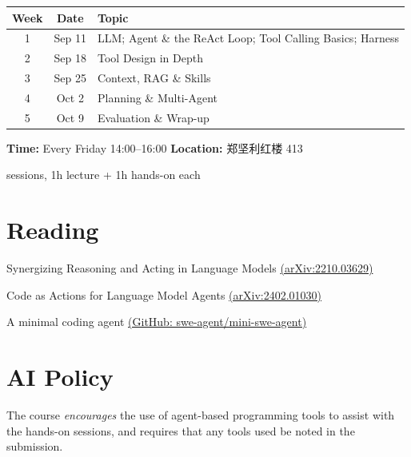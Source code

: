 \documentclass[12pt]{ctexart}
\begin{document}
\begin{center}
\begin{tabularx}{0.8\textwidth}{@{}c c >{\raggedright\arraybackslash}X@{}}
  \toprule
  \bfseries Week & \bfseries Date & \bfseries Topic \\
  \midrule
  1 & Sep 11  & LLM; Agent \& the ReAct Loop; Tool Calling Basics; Harness \\
  2 & Sep 18  & Tool Design in Depth \\
  3 & Sep 25  & Context, RAG \& Skills \\
  4 & Oct 2   & Planning \& Multi-Agent \\
  5 & Oct 9   & Evaluation \& Wrap-up \\
  \bottomrule
\end{tabularx}
\end{center}

\noindent\textbf{Time:} Every Friday 14:00--16:00 \quad \textbf{Location:} 郑坚利红楼 413

 sessions, 1h lecture + 1h hands-on each

\section{Reading}

\begin{description}[leftmargin=6em, font=\normalfont\emph]
  \item[ReAct] Synergizing Reasoning and Acting in Language Models \href{https://arxiv.org/abs/2210.03629}{(arXiv:2210.03629)}
  \item[CodeAct] Code as Actions for Language Model Agents \href{https://arxiv.org/abs/2402.01030}{(arXiv:2402.01030)}
  \item[mini-swe-agent] A minimal coding agent \href{https://github.com/swe-agent/mini-swe-agent}{(GitHub: swe-agent/mini-swe-agent)}
\end{description}

\section{AI Policy}

The course \emph{encourages} the use of agent-based programming tools to assist with the hands-on sessions, and requires that any tools used be noted in the submission.
\end{document}
